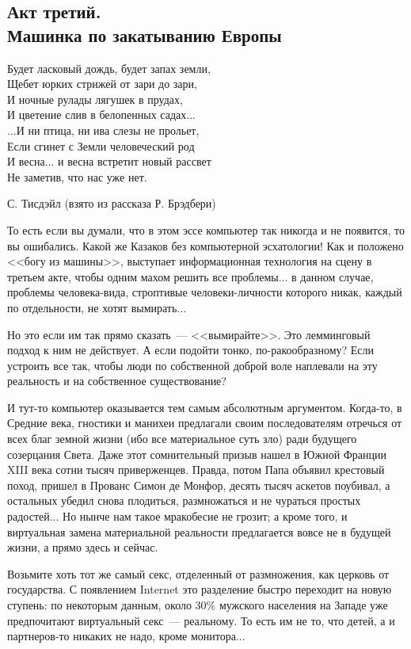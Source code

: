 \documentclass{scrbook}
\makeatletter
\newcommand{\isSevenInches}{\boolexpr{\value{bookformat} = \value{bfSevenInches}}}
\newcommand{\bigepigraphwidth}{0.8} %
\newcommand{\defaultepigraphwidth}{0.5} %
\newcommand{\flqq}{<<}
\newcommand{\frqq}{>>}
\newcommand{\mdash}{~--- }
\newcommand{\essaysection}[1]{\subsection*{#1}\nopagebreak}
\newcommand{\myepigraph}[3][\@empty]{
	\ifx\@empty#1
		\setlength{\epigraphwidth}{\defaultepigraphwidth\textwidth}
	\else
		\setlength{\epigraphwidth}{#1\textwidth}
	\fi
	\epigraph{#2}{#3}
	\setlength{\epigraphwidth}{\defaultepigraphwidth\textwidth} %
	\nopagebreak
}
\makeatother
\begin{document}
\ifcase\isSevenInches
	\pagebreak 
\fi

\essaysection{Акт третий. \\ Машинка по закатыванию Европы}

\myepigraph[\bigepigraphwidth]{Будет ласковый дождь, будет запах земли, \\
Щебет юрких стрижей от зари до зари, \\
И ночные рулады лягушек в прудах, \\
И цветение слив в белопенных садах... \\
...И ни птица, ни ива слезы не прольет, \\
Если сгинет с Земли человеческий род \\
И весна... и весна встретит новый рассвет \\
Не заметив, что нас уже нет.}
{С. Тисдэйл (взято из рассказа Р. Брэдбери)}

То есть если вы думали, что в этом эссе компьютер так никогда и не появится, то вы ошибались. Какой же Казаков без компьютерной эсхатологии! Как и положено {\flqq}богу из машины{\frqq}, выступает информационная технология на сцену в третьем акте, чтобы одним махом решить все проблемы... в данном случае, проблемы человека-вида, строптивые человеки-личности которого никак, каждый по отдельности, не хотят вымирать...

Но это если им так прямо сказать{\mdash}{\flqq}вымирайте{\frqq}. Это лемминговый подход к ним не действует. А если подойти тонко, по-ракообразному? Если устроить все так, чтобы люди по собственной доброй воле наплевали на эту реальность и на собственное существование?

И тут-то компьютер оказывается тем самым абсолютным аргументом. Когда-то, в Средние века, гностики и манихеи предлагали своим последователям отречься от всех благ земной жизни (ибо все материальное суть зло) ради будущего созерцания Света. Даже этот сомнительный призыв нашел в Южной Франции XIII века сотни тысяч приверженцев. Правда, потом Папа объявил крестовый поход, пришел в Прованс Симон де Монфор, десять тысяч аскетов поубивал, а остальных убедил снова плодиться, размножаться и не чураться простых радостей... Но нынче нам такое мракобесие не грозит; а кроме того, и виртуальная замена материальной реальности предлагается вовсе не в будущей жизни, а прямо здесь и сейчас.

Возьмите хоть тот же самый секс, отделенный от размножения, как церковь от государства. С появлением Internet это разделение быстро переходит на новую ступень: по некоторым данным, около 30\% мужского населения на Западе уже предпочитают виртуальный секс{\mdash}реальному. То есть им не то, что детей, а и партнеров-то никаких не надо, кроме монитора...
\end{document}
